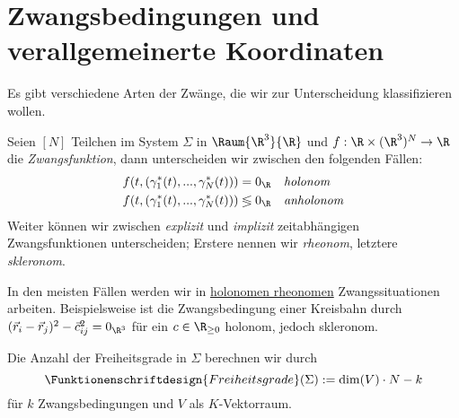 \documentclass[../main.tex]{subfiles}
\begin{document}
	\section{Zwangsbedingungen und verallgemeinerte Koordinaten}
		Es gibt verschiedene Arten der Zwänge, die wir zur Unterscheidung klassifizieren wollen.
		\begin{info}[Zwangsbedingungsklassifizierung]
			Seien $[N]$ Teilchen im System $\Sigma$ in $\Raum{\R^3}{\R}$ und $f:\R\times(\R^3)^N\to\R$ die \emph{Zwangsfunktion}, dann unterscheiden wir zwischen den folgenden Fällen:
			\begin{align*}
				f(t,(\gamma_1^*(t),...,\gamma_N^*(t)))&=0_\R &&\textit{holonom} \\
				f(t,(\gamma_1^*(t),...,\gamma_N^*(t)))&\lessgtr 0_\R &&\textit{anholonom}
			\end{align*}
			Weiter können wir zwischen \emph{explizit} und \emph{implizit} zeitabhängigen Zwangsfunktionen unterscheiden; Erstere nennen wir \emph{rheonom}, letztere \emph{skleronom}. 
		\end{info}
		\noindent In den meisten Fällen werden wir in \underline{holonomen rheonomen} Zwangssituationen arbeiten. Beispielsweise ist die Zwangsbedingung einer Kreisbahn durch $(\vec{r}_i-\vec{r}_j)^2-\vec c_{ij}^2=0_{\R^3}$ für ein $c\in\R_{\geq 0}$ holonom, jedoch skleronom. 
		\begin{info}[Freiheitsgrade]
			Die Anzahl der Freiheitsgrade in $\Sigma$ berechnen wir durch 
			$$\Funktionenschriftdesign{Freiheitsgrade}(\Sigma):=\dim(V)\cdot N-k$$
			für $k$ Zwangsbedingungen und $V$ als $K$-Vektorraum. 
		\end{info}
\end{document}
